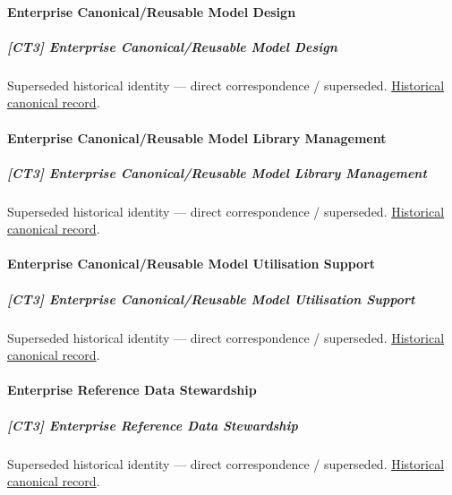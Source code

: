 \paragraph{Enterprise Canonical/Reusable Model Design}

\subparagraph{[CT3] Enterprise Canonical/Reusable Model Design}

\par\label{element:dbc37445ad944a85a7c4f26f410967b2}
Superseded historical identity — direct correspondence / superseded. \href{../../../../continuum/strategy/capability/dbc37445ad944a85a7c4f26f410967b2.md}{Historical canonical record}.\par

\paragraph{Enterprise Canonical/Reusable Model Library Management}

\subparagraph{[CT3] Enterprise Canonical/Reusable Model Library Management}

\par\label{element:f5eccd4f65df49bba98104e5abfa5e19}
Superseded historical identity — direct correspondence / superseded. \href{../../../../continuum/strategy/capability/f5eccd4f65df49bba98104e5abfa5e19.md}{Historical canonical record}.\par

\paragraph{Enterprise Canonical/Reusable Model Utilisation Support}

\subparagraph{[CT3] Enterprise Canonical/Reusable Model Utilisation Support}

\par\label{element:7ae95677a00346f18a0ba01522a20153}
Superseded historical identity — direct correspondence / superseded. \href{../../../../continuum/strategy/capability/7ae95677a00346f18a0ba01522a20153.md}{Historical canonical record}.\par

\paragraph{Enterprise Reference Data Stewardship}

\subparagraph{[CT3] Enterprise Reference Data Stewardship}

\par\label{element:fd9f3239fdb64ea687825b66bb4d1f17}
Superseded historical identity — direct correspondence / superseded. \href{../../../../continuum/strategy/capability/fd9f3239fdb64ea687825b66bb4d1f17.md}{Historical canonical record}.\par

